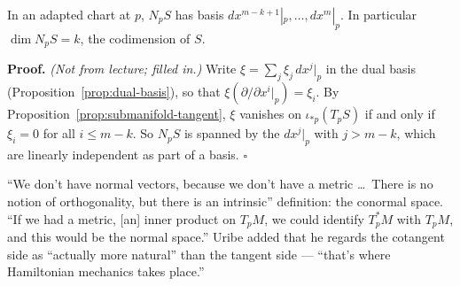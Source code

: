 \documentclass[11pt]{report}
\makeatletter
\newcounter{thmcounter}[section]
\renewenvironment{proof}[1][Proof]{\noindent\textbf{#1.} }{\hfill$\square$\par\vspace{5pt}}
\newcommand{\thmlabel}[1]{\edef\@currentlabel{\arabic{section}.\arabic{thmcounter}}\label{#1}}
\makeatother
\begin{document}
\begin{propbox}\thmlabel{prop:conormal-basis}
In an adapted chart at $p$, $N_pS$ has basis $dx^{m-k+1}|_p, \ldots, dx^m|_p$. In particular $\dim N_pS = k$, the codimension of $S$.
\end{propbox}

\begin{proof}
\textit{(Not from lecture; filled in.)} Write $\xi = \sum_j \xi_j\, dx^j|_p$ in the dual basis (Proposition~\ref{prop:dual-basis}), so that $\xi(\partial/\partial x^i|_p) = \xi_i$. By Proposition~\ref{prop:submanifold-tangent}, $\xi$ vanishes on $\iota_{*p}(T_pS)$ if and only if $\xi_i = 0$ for all $i \le m - k$. So $N_pS$ is spanned by the $dx^j|_p$ with $j > m - k$, which are linearly independent as part of a basis.
\end{proof}

\begin{rembox}\label{rem:no-normal-vectors-without-metric}
``We don't have normal vectors, because we don't have a metric \ldots\ There is no notion of orthogonality, but there is an intrinsic'' definition: the conormal space. ``If we had a metric, [an] inner product on $T_pM$, we could identify $T^*_pM$ with $T_pM$, and this would be the normal space.'' Uribe added that he regards the cotangent side as ``actually more natural'' than the tangent side --- ``that's where Hamiltonian mechanics takes place.''
\end{rembox}
\end{document}
